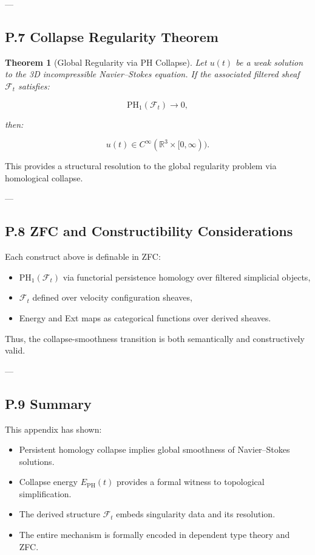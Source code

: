 \documentclass[11pt]{article}
\newtheorem{theorem}{Theorem}[section]
\begin{document}
---

\subsection*{P.7 Collapse Regularity Theorem}

\begin{theorem}[Global Regularity via PH Collapse]
Let $u(t)$ be a weak solution to the 3D incompressible Navier–Stokes equation.  
If the associated filtered sheaf $\mathcal{F}_t$ satisfies:

\[
\mathrm{PH}_1(\mathcal{F}_t) \to 0,
\]

then:

\[
u(t) \in C^\infty(\mathbb{R}^3 \times [0, \infty)).
\]
\end{theorem}

This provides a structural resolution to the global regularity problem via homological collapse.

---

\subsection*{P.8 ZFC and Constructibility Considerations}

Each construct above is definable in ZFC:
\begin{itemize}
  \item $\mathrm{PH}_1(\mathcal{F}_t)$ via functorial persistence homology over filtered simplicial objects,
  \item $\mathcal{F}_t$ defined over velocity configuration sheaves,
  \item Energy and Ext maps as categorical functions over derived sheaves.
\end{itemize}

Thus, the collapse-smoothness transition is both semantically and constructively valid.

---

\subsection*{P.9 Summary}

This appendix has shown:
\begin{itemize}
  \item Persistent homology collapse implies global smoothness of Navier–Stokes solutions.
  \item Collapse energy $E_{\mathrm{PH}}(t)$ provides a formal witness to topological simplification.
  \item The derived structure $\mathcal{F}_t$ embeds singularity data and its resolution.
  \item The entire mechanism is formally encoded in dependent type theory and ZFC.
\end{itemize}
\end{document}
